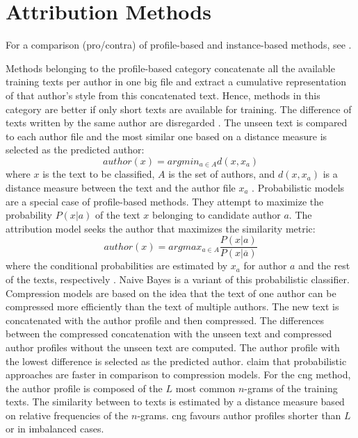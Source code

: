 \section{Attribution Methods}
\label{sec:attribution_methods}

For a comparison (pro/contra) of profile-based and instance-based methods, see \citet{stamatatos_survey_2009}.

Methods belonging to the profile-based category concatenate all the available training texts per author in one big file 
and extract a cumulative representation of that author's style from this concatenated text.
Hence, methods in this category are better if only short texts are available for training.
The difference of texts written by the same author are disregarded \cite{stamatatos_survey_2009}.
The unseen text is compared to each author file and the most similar one based on a distance measure is selected as the predicted author:
$$ author(x) = argmin_{a \in A} d(x, x_a) $$
where $x$ is the text to be classified, $A$ is the set of authors, and $d(x, x_a)$ is a distance measure 
between the text and the author file $x_a$ \cite{stamatatos_survey_2009}.
Probabilistic models are a special case of profile-based methods.
They attempt to maximize the probability $P(x|a)$ of the text $x$ belonging to candidate author $a$.
The attribution model seeks the author that maximizes the similarity metric: 
$$ author(x) = argmax_{a \in A} \frac{P(x|a)}{P(x|\overline{a})} $$
where the conditional probabilities are estimated by $x_a$ for author $a$ and the rest of the texts, respectively \cite{stamatatos_survey_2009}.
Naive Bayes is a variant of this probabilistic  classifier.
Compression models are based on the idea that the text of one author can be compressed more efficiently than the text of multiple authors.
The new text is concatenated with the author profile and then compressed.
The differences between the compressed concatenation with the unseen text and compressed author profiles without the unseen text are computed.
The author profile with the lowest difference is selected as the predicted author.
\citet{stamatatos_survey_2009} claim that probabilistic approaches are faster in comparison to compression models.
For the \ac{cng} method, the author profile is composed of the $L$ most common $n$-grams of the training texts.
The similarity between to texts is estimated by a distance measure based on relative frequencies of the $n$-grams.
\ac{cng} favours author profiles shorter than $L$ or in imbalanced cases.
